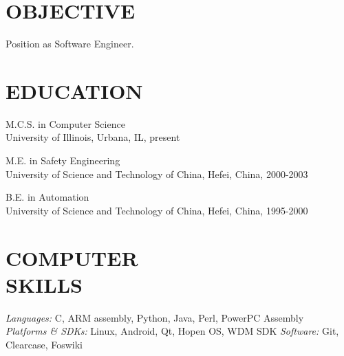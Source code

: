 \documentclass[line,margin]{res}
\begin{document}
\address{111 South Busey Avenue, Urbana, IL 61801}
\address{(217) 898-3636}

 
\begin{resume}
 
\section{OBJECTIVE} Position as Software Engineer.
 
\section{EDUCATION} {\sl}
                M.C.S. in Computer Science\\
                University of Illinois, Urbana, IL, present

                M.E. in Safety Engineering\\
                University of Science and Technology of China, Hefei, China, 2000-2003

                B.E. in Automation\\
                University of Science and Technology of China, Hefei, China, 1995-2000
 
\section{COMPUTER \\ SKILLS} {\sl Languages:} C, ARM assembly, Python, Java, Perl, PowerPC Assembly\\
                {\sl Platforms \& SDKs:} Linux, Android, Qt, Hopen OS, WDM SDK
                {\sl Software:} Git, Clearcase, Foswiki
 

\end{resume}
\end{document}
